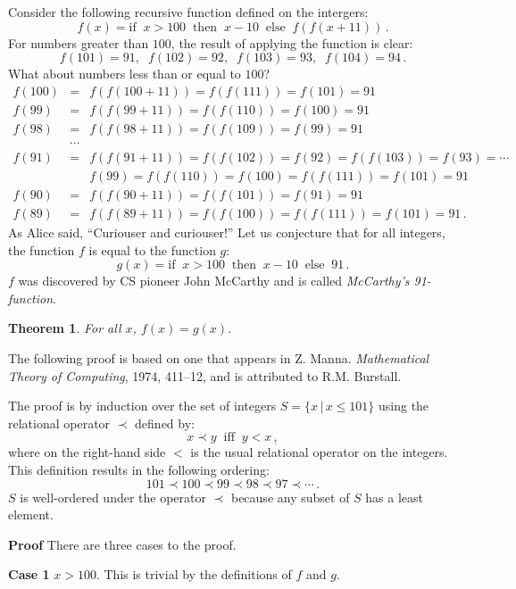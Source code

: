 \documentclass[11pt,a4paper]{report}
\newtheorem{theorem}{Theorem}
\begin{document}
Consider the following recursive function defined on the intergers:
\[
f(x) = \textrm{if}\;\; x > 100 \;\;\textrm{then}\;\; x - 10 \;\;\textrm{else}\;\; f(f(x+11))\,.
\]
For numbers greater than $100$, the result of applying the function is clear:
\[
f(101) = 91, \;\; f(102) = 92,\;\; f(103) = 93,\;\; f(104) = 94\,.
\]
What about numbers less than or equal to $100$?
\begin{eqnarray*}
f(100) &=& f(f(100+11)) = f(f(111)) = f(101) = 91\\
f(99) &=& f(f(99+11)) = f(f(110)) = f(100) = 91\\
f(98) &=& f(f(98+11)) = f(f(109)) = f(99) = 91\\
&\cdots&\\
f(91) &=& f(f(91+11)) = f(f(102)) = f(92) = f(f(103)) = f(93) = \cdots\\
&&f(99) = f(f(110)) = f(100) = f(f(111)) = f(101) = 91\\
f(90) &=& f(f(90+11)) = f(f(101)) = f(91) = 91\\
f(89) &=& f(f(89+11)) = f(f(100)) = f(f(111)) = f(101) = 91\,.
\end{eqnarray*}
As Alice said, ``Curiouser and curiouser!'' Let us conjecture that for all integers, the function $f$ is equal to the function $g$:
\[
g(x) = \textrm{if}\;\; x > 100 \;\;\textrm{then}\;\; x - 10 \;\;\textrm{else}\;\; 91\,.
\]
$f$ was discovered by CS pioneer John McCarthy and is called \emph{McCarthy's 91-function}.

\begin{theorem}
For all $x$, $f(x) = g(x)$.
\end{theorem}

The following proof is based on one that appears in Z. Manna. \textit{Mathematical Theory of Computing}, 1974, 411--12, and is attributed to R.M. Burstall.

The proof is by induction over the set of integers $S=\{x\,|\,x\leq 101\}$ using the relational operator $\prec$ defined by:
\[
x \prec y \;\; \textrm{iff}\;\; y < x\,,
\]
where on the right-hand side $<$ is the usual relational operator on the integers.
This definition results in the following ordering:
\[
101 \prec 100 \prec 99 \prec 98 \prec 97 \prec \cdots\,.
\]
$S$ is well-ordered under the operator $\prec$ because any subset of $S$ has a least element.


\textbf{Proof} There are three cases to the proof.

\textbf{Case 1} $x > 100$. This is trivial by the definitions of $f$ and $g$.
\end{document}
